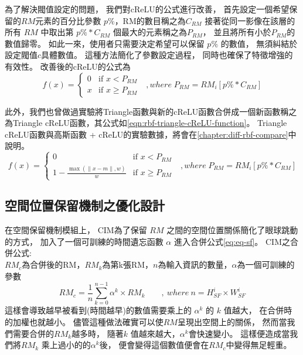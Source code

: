 \documentclass[class=NCU_thesis, crop=false]{standalone}
\begin{document}
	為了解決閥值設定的問題，
	我們對cReLU的公式進行改善，
	首先設定一個希望保留的$RM$元素的百分比參數 $p\%$，RM的數目稱之為$C_{RM}$
	接著從同一影像在該層的所有 $RM$ 中取出第 $p\% * C_{RM}$  個最大的元素稱之為$P_{RM}$，
	並且將所有小於$P_{RM}$的數值歸零。
	如此一來，使用者只需要決定希望可以保留 $p\%$ 的數值，
	無須糾結於設定閥值$c$具體數值。
	這種方法簡化了參數設定過程，
	同時也確保了特徵增強的有效性。
	改善後的cReLU的公式為\\
	\begin{equation}
	    \label{eq:eq-cReLUPercent}
	    f(x)= 
	    \begin{cases}
	        0 & \text{if  $x < P_{RM}$ }\\
	        x & \text{if  $x \geq P_{RM}$}
	    \end{cases}, where \; P_{RM} = RM_{i}\left[ p\% * C_{RM} \right]
	\end{equation}

	 \pagebreak
	此外，我們也曾做過實驗將Triangle函數與新的cReLU函數合併成一個新函數稱之為Triangle cReLU函數，其公式如\cref{eqn:rbf-triangle-cReLU-function}。
	Triangle cReLU函數與高斯函數 + cReLU的實驗數據，將會在\cref{chapter:diff-rbf-compare}中說明。
	\begin{equation}
      \label{eqn:rbf-triangle-cReLU-function}
      f(x)= 
      \begin{cases}
	        0 & \text{if  $x < P_{RM}$ }\\
	        1 - \frac{ \max \left( \| x-m \|, w \right)}{w} & \text{if  $x \geq P_{RM}$}
	   \end{cases}, where \; P_{RM} = RM_{i}\left[ p\% * C_{RM} \right]
  	\end{equation}
	

	\pagebreak

	\subsection{空間位置保留機制之優化設計}
	在空間保留機制模組上，
	CIM為了保留 $RM$ 之間的空間位置關係簡化了眼球跳動的方式，
	加入了一個可訓練的時間遺忘函數 $\alpha$ 進入合併公式\cref{eq:eq-sf}。
	CIM之合併公式:\cite{YangCNNInterpretable}\\
		$RM_{c}$為合併後的RM，$RM_{k}$為第k張RM，$n$為輸入資訊的數量，$\alpha$為一個可訓練的參數
		\begin{equation}
		    \label{eq:eq-sf}
		    RM_{c}=\frac{1}{n} \sum_{k = 0}^{n-1} \alpha^{k} \times RM_{k}  \qquad ,\ where\ n = \textit{H}^{i}_{SF} \times \textit{W}^{i}_{SF}
		\end{equation}
	這樣會導致越早被看到(時間越早)的數值需要乘上的 $\alpha^{k}$ 的 $k$ 值越大，
	在合併時的加權也就越小。
	儘管這種做法確實可以使$RM$呈現出空間上的關係，
	然而當我們需要合併的$RM_{k}$越多時，
	隨著$k$ 值越來越大，$\alpha^{k}$會快速變小。
	這樣便造成當我們將$RM_{k}$ 乘上過小的的$\alpha^{k}$後，
	便會變得這個數值便會在$RM_{c}$中變得無足輕重。
\end{document}
